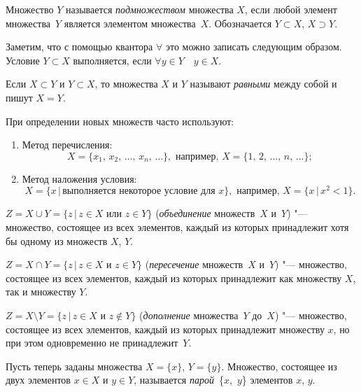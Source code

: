 \begin{defn}
Множество $Y$ называется \textit{подмножеством} множества $X$, если любой элемент множества~$Y$ является элементом множества~$X$. Обозначается $Y \subset X$, $X \supset Y$.
\end{defn}

Заметим, что с помощью квантора $\forall$ это можно записать следующим образом. Условие $Y \subset X$ выполняется, если $\forall y\in Y\quad  y\in X$. 

\begin{defn}
Если $X \subset Y$ и $Y \subset X$, то множества $X$ и $Y$ называют \textit{равными} между собой и пишут $X = Y$.
\end{defn}


При определении новых множеств часто используют:
\begin{enumerate}[wide, labelwidth=!, noitemsep]
\item 
Метод перечисления: 
$$
X = \{x_1,\,x_2,\,\dots,\,x_n,\,\dots \}, \text{ например, }
X = \{1,\, 2,\, \dots,\, n,\, \dots \};
$$

\item Метод наложения условия: 
$$
X = \{x\,\big|\, \text{выполняется некоторое условие для $x$}\}, \text{ например, }
X = \{x\,\big|\,x^2 < 1\}.
$$
\end{enumerate}

\begin{defn}
$Z = X \cup Y = \{z\,\big|\, z\in X \text{ или } z\in Y\}$ (\textit{объединение} множеств~$X$ и~$Y$) "--- множество, состоящее из всех элементов, каждый из которых принадлежит хотя бы одному из множеств $X$, $Y$.
\end{defn}
\begin{defn}
$Z = X \cap Y = \{z\,\big|\, z\in X \text{ и } z\in Y\}$ (\textit{пересечение} множеств~$X$ и~$Y$) "--- множество, состоящее из всех элементов, каждый из которых принадлежит как множеству $X$, так и множеству $Y$.
\end{defn}
\begin{defn}
$Z =X \setminus Y = \{z\,\big|\, z\in X \text{ и } z\notin Y\}$ (\textit{дополнение} множества~$Y$ до~$X$) "--- множество, состоящее из всех элементов, каждый из которых принадлежит множеству $x$, но при этом одновременно не принадлежит~$Y$.
\end{defn}

\begin{defn}
Пусть теперь заданы множества $X= \{x\}$, $Y = \{y\}$. Множество, состоящее из двух элементов $x\in X$ и $y\in Y$, называется \textit{парой}~\{$x$,~$y$\} элементов $x$, $y$. 
\end{defn}

